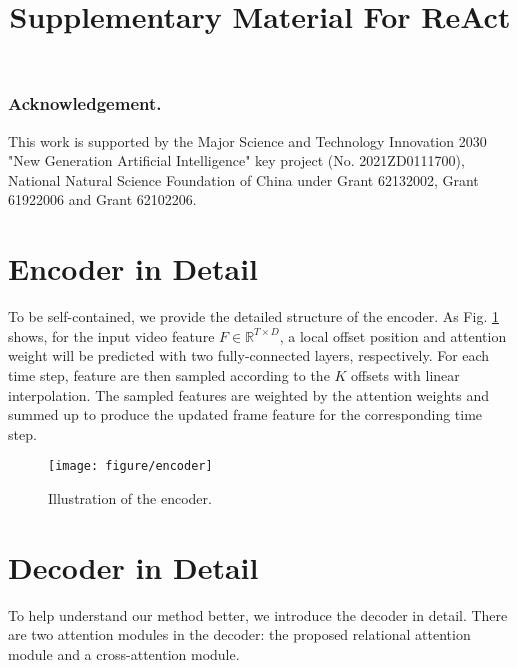 \documentclass[runningheads]{llncs}
\newcommand{\figref}[1]{Fig. \ref{#1}}
\newcommand{\mb}[1]{\mathbb{#1}}
\begin{document}
\subsubsection{Acknowledgement.} 
This work is supported by the Major Science and Technology Innovation 2030 "New Generation Artificial Intelligence" key project (No. 2021ZD0111700), National Natural Science Foundation of China under Grant 62132002, Grant 61922006 and Grant 62102206.

\clearpage






\appendix


\title{Supplementary Material For ReAct} 

\author{}
\institute{}
\maketitle



\section{Encoder in Detail}
To be self-contained, we provide the detailed structure of the encoder.
As \figref{encoder} shows, for the input video feature $F\in\mb{R}^{T \times D}$, a local offset position and attention weight will be predicted with two fully-connected layers, respectively. For each time step, feature are then sampled according to the $K$ offsets with linear interpolation. The sampled features are weighted by the attention weights and summed up to produce the updated frame feature for the corresponding time step.

\vspace{-0.4 cm}
\begin{figure}[]
    \centering
    \setlength{\abovecaptionskip}{-0.2cm}
    \texttt{[image: figure/encoder]}
  \caption{Illustration of the encoder.}
  \label{encoder}
  \vspace{-0.5cm}
\end{figure}







\section{Decoder in Detail}
To help understand our method better, we introduce the decoder in detail. There are two attention modules in the decoder: the proposed relational attention module and a cross-attention module.
\end{document}
